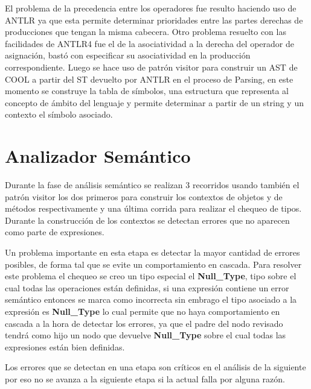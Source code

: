 \documentclass[12pt,a4paper]{article}
\begin{document}
		El problema de la precedencia entre los operadores fue resulto haciendo uso de ANTLR ya que esta permite determinar prioridades entre las partes derechas de producciones que tengan la misma cabecera.	Otro problema resuelto con las facilidades de ANTLR4 fue el de la asociatividad a la derecha del operador de asignación, bastó con especificar su asociatividad en la producción correspondiente. Luego se hace uso de patrón visitor para construir un AST de COOL a partir del ST devuelto por ANTLR en el proceso de Parsing, en este momento se construye la tabla de símbolos, una estructura que representa al concepto de ámbito del lenguaje y permite determinar a partir de un string y un contexto el símbolo asociado.   
	\section{Analizador Semántico}
		Durante la fase de análisis semántico se realizan 3 recorridos usando también el patrón visitor los dos primeros para construir los contextos de objetos y de métodos respectivamente y una última corrida para realizar el chequeo de tipos. Durante la
		construcción de los contextos se detectan errores que no aparecen como parte de expresiones. 
		
		Un problema importante en esta etapa es detectar la mayor cantidad de errores posibles, de forma  tal que se evite un comportamiento en cascada. Para resolver este problema el chequeo se creo un tipo especial el \textbf{Null\_Type}, tipo sobre el cual todas las operaciones están definidas, si una expresión contiene un error semántico entonces se marca como incorrecta sin embrago el tipo asociado a la expresión es \textbf{Null\_Type} lo cual permite que no haya comportamiento en cascada a la hora de detectar los errores, ya que el padre del nodo revisado tendrá como hijo un nodo que devuelve \textbf{Null\_Type} sobre el cual todas las expresiones están bien definidas.
		
		Los errores que se detectan en una etapa son críticos en el análisis de la siguiente por eso no se avanza a la siguiente etapa si la actual falla por alguna razón.
\end{document}
